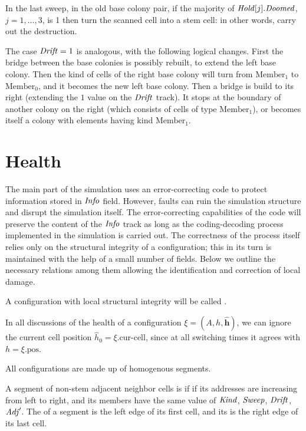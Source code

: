 \documentclass[11pt]{memoir}
\theoremstyle{definition} %
\renewcommand{\vek}[1]{\mathbf{#1}}
\newcommand{\fld}[1]{\ensuremath{\textit{#1\/}}}
\newcommand{\h}{h}
\newcommand{\hc}{\hat h}
\newcommand{\vhc}{\vek{\hat h}}
\newcommand{\pos}{\mathrm{pos}}
\newcommand{\curcell}{\textrm{cur-cell}}
\newcommand{\Drift}{\fld{Drift}}
\newcommand{\Doomed}{\fld{Doomed}}
\newcommand{\Adj}{\fld{Adj}}
\newcommand{\cHold}{\fld{Hold}}
\newcommand{\Info}{\fld{Info}}
\newcommand{\Kind}{\fld{Kind}}
\newcommand{\Sweep}{\fld{Sweep}}
\newcommand{\Member}{\mathrm{Member}}
\begin{document}
\begin{sloppypar}
In the last sweep, 
in the old base colony pair, if the majority of \( \cHold[j].\Doomed \), \( j=1,\dots,3 \), 
is 1 then turn the scanned cell into a stem cell: 
in other words, carry out the destruction.
\end{sloppypar}

The case \( \Drift=1 \) is analogous, with the following logical changes.
First the bridge between the base colonies is possibly rebuilt, to extend the left base colony.
Then the kind of cells of the right base colony will turn from \( \Member_{1} \)
to \( \Member_{0} \), and it becomes the new left base colony.
Then a bridge is build to its right (extending the \( 1 \) value on the \( \Drift \) track).
It stops at the boundary of another colony on the right
(which consists of cells of type \( \Member_{1} \)), or becomes itself a colony with elements having
kind \( \Member_{1} \).

\section{Health}            \label{sec:health}

The main part of the simulation uses an error-correcting
code to protect information stored in \( \Info \) field.
However, faults can ruin the simulation structure and disrupt the simulation itself.
The error-correcting capabilities of the code 
will preserve the content of the \( \Info \) track as long as the coding-decoding
process implemented in the simulation is carried out.
The correctness of the process itself relies only on
the structural integrity of a configuration; this in its turn is maintained with the help of a small number
of fields.
Below we outline the necessary relations among them 
allowing the identification and correction of local damage.

A configuration with local structural integrity will be called .
\begin{sloppypar}
\begin{remark}
In all discussions of the health of a configuration \( \xi=(A,\h,\vhc) \), we can ignore
the current cell position \( \hc_{0}=\xi.\curcell \), since at all switching times 
it agrees with \( \h=\xi.\pos \).
\end{remark}
\end{sloppypar}

All configurations are made up of homogenous segments.

\begin{definition}\label{def:segments}
  A segment of non-stem adjacent neighbor cells is  if
  if its addresses are increasing from left to right, and its members
  have the same value of \( \Kind \), \( \Sweep \), \( \Drift \), \( \Adj' \).
The  of a segment is the left edge of its first cell, and its  is 
the right edge of its last cell.
\end{definition}
\end{document}
